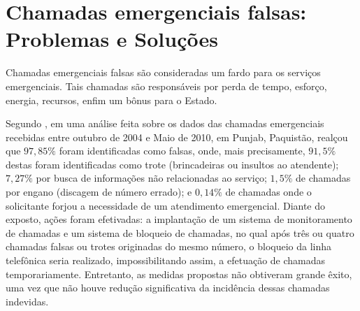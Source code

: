 \section{Chamadas emergenciais falsas: Problemas e Soluções}
Chamadas emergenciais falsas são consideradas um fardo para os serviços emergenciais. Tais chamadas são responsáveis por perda de tempo, esforço, energia, recursos, enfim um bônus para o Estado.

Segundo \cite{waseem2010prank}, em uma análise feita sobre os dados das chamadas emergenciais recebidas entre outubro de 2004 e Maio de 2010, em Punjab, Paquistão, realçou que $97,85\%$ foram identificadas como falsas, onde, mais precisamente, $91,5\%$ destas foram identificadas como trote (brincadeiras ou insultos ao atendente); $7,27\%$ por busca de informações não relacionadas ao serviço; $1,5\%$ de chamadas por engano (discagem de número errado); e $0,14\%$ de chamadas onde o solicitante forjou a necessidade de um atendimento emergencial. 
Diante do exposto, ações foram efetivadas: a implantação de um sistema de monitoramento de chamadas e um sistema de bloqueio de chamadas, no qual após três ou quatro chamadas falsas ou trotes originadas do mesmo número, o bloqueio da linha telefônica seria realizado, impossibilitando assim, a efetuação de chamadas temporariamente.
Entretanto, as medidas propostas não obtiveram grande êxito, uma vez que não houve redução significativa da incidência dessas chamadas indevidas.

